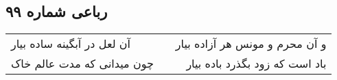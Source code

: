 \begin{center}
\section*{رباعی شماره ۹۹}
\label{sec:sh099}
\begin{longtable}{l p{0.5cm} r}
آن لعل در آبگینه ساده بیار
&&
و آن محرم و مونس هر آزاده بیار
\\
چون میدانی که مدت عالم خاک
&&
باد است که زود بگذرد باده بیار
\\
\end{longtable}
\end{center}
